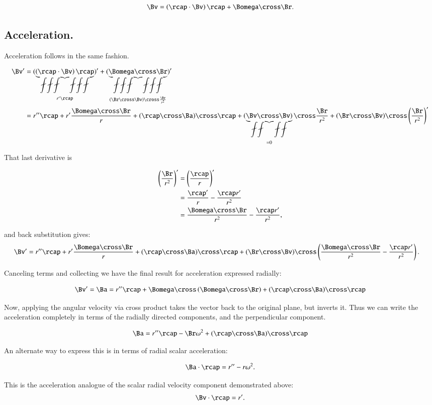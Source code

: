 \[
\Bv = \left(\rcap \cdot \Bv\right) \rcap + \Bomega \cross \Br.
\]

\subsection{Acceleration. }

Acceleration follows in the same fashion.

\begin{align*}
\Bv'
&= (
\underbrace{\left(\rcap \cdot \Bv\right) \rcap}_{r'\rcap}
)' + (
\underbrace{\Bomega \cross \Br}_
{(\Br \cross \Bv) \cross \frac{\Br}{r^2}}
)' \\
&= r'' \rcap 
 + r' \frac{\Bomega \cross \Br}{r}
 + (\rcap \cross \Ba) \cross \rcap
 + (\underbrace{\Bv \cross \Bv)}_{=0} \cross \frac{\Br}{r^2}
 + (\Br \cross \Bv) \cross \left(\frac{\Br}{r^2}\right)'
\end{align*}

That last derivative is

\begin{align*}
\left(\frac{\Br}{r^2}\right)' 
&= \left(\frac{\rcap}{r}\right)' \\
&= \frac{\rcap'}{r} - \frac{\rcap r'}{r^2} \\
&= \frac{\Bomega \cross \Br}{r^2} - \frac{\rcap r'}{r^2},
\end{align*}

and back substitution gives:
\begin{align*}
\Bv'
&= r'' \rcap 
 + r' \frac{\Bomega \cross \Br}{r}
 + (\rcap \cross \Ba) \cross \rcap
 + (\Br \cross \Bv) \cross \left( \frac{\Bomega \cross \Br}{r^2} - \frac{\rcap r'}{r^2} \right).
\end{align*}

Canceling terms and collecting we have the final result for acceleration expressed radially:

\begin{equation}
\Bv' = \Ba = r'' \rcap + \Bomega \cross \left( {\Bomega \cross \Br} \right) + (\rcap \cross \Ba) \cross \rcap
\end{equation}

Now, applying the angular velocity via cross product takes the vector back to the original plane, but inverts it.  Thus we can write the acceleration completely in terms of the radially directed components, and the perpendicular component.

\begin{equation}
\Ba = r'' \rcap -\Br \omega^2 + (\rcap \cross \Ba) \cross \rcap
\end{equation}

An alternate way to express this is in terms of radial scalar acceleration:

\begin{equation}
\Ba \cdot \rcap = r'' - r\omega^2.
\end{equation}

This is the acceleration analogue of the scalar radial velocity component demonstrated above:
\begin{equation}
\Bv \cdot \rcap = r'.
\end{equation}
